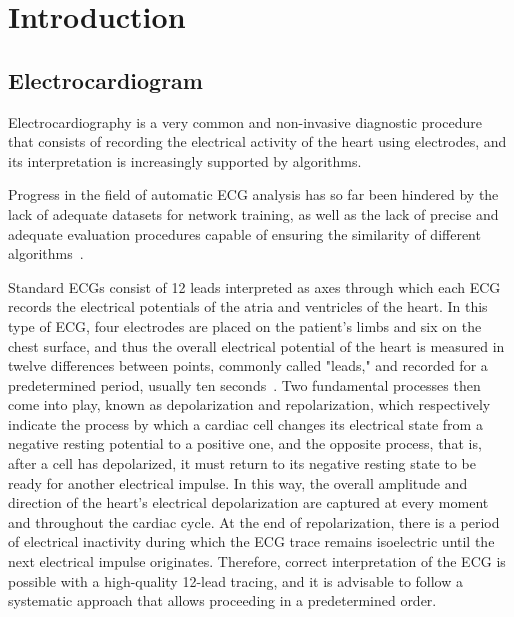 \documentclass[12pt,english]{report}
\newcommand\blankpage{
    \null
    \thispagestyle{empty}
    \addtocounter{page}{-1}
    \newpage}
\begin{document}
\afterpage{\blankpage}
\frontespizio
\beforepreface
\afterpreface
\afterpage{\blankpage}

\chapter{Introduction}
\label{chap:introduction}

\section{Electrocardiogram}
\label{sec:electrocardiogram}

Electrocardiography is a very common and non-invasive diagnostic procedure that consists of recording the electrical activity of the heart using electrodes, and its interpretation is increasingly supported by algorithms.

Progress in the field of automatic ECG analysis has so far been hindered by the lack of adequate datasets for network training, as well as the lack of precise and adequate evaluation procedures capable of ensuring the similarity of different algorithms~\cite{deeplearning}.

Standard ECGs consist of 12 leads interpreted as axes through which each ECG records the electrical potentials of the atria and ventricles of the heart. In this type of ECG, four electrodes are placed on the patient's limbs and six on the chest surface, and thus the overall electrical potential of the heart is measured in twelve differences between points, commonly called "leads," and recorded for a predetermined period, usually ten seconds~\cite{ecg}. Two fundamental processes then come into play, known as depolarization and repolarization, which respectively indicate the process by which a cardiac cell changes its electrical state from a negative resting potential to a positive one, and the opposite process, that is, after a cell has depolarized, it must return to its negative resting state to be ready for another electrical impulse. In this way, the overall amplitude and direction of the heart's electrical depolarization are captured at every moment and throughout the cardiac cycle. At the end of repolarization, there is a period of electrical inactivity during which the ECG trace remains isoelectric until the next electrical impulse originates. Therefore, correct interpretation of the ECG is possible with a high-quality 12-lead tracing, and it is advisable to follow a systematic approach that allows proceeding in a predetermined order.
\end{document}
